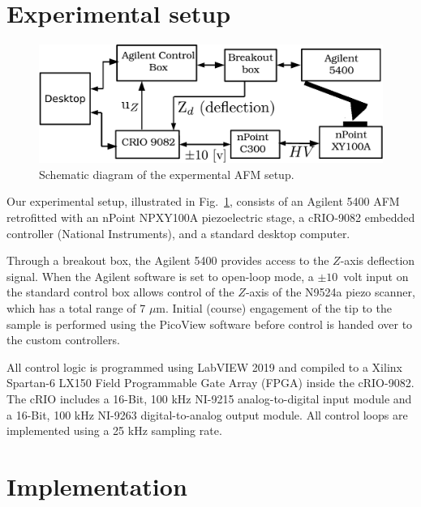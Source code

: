 \documentclass[twocolumn,oneside]{IEEEtran/IEEEtran}
\begin{document}
\section{Experimental setup} \label{sec:experimentalSetup}
\begin{figure}[ht!]
  \includegraphics[width=1\columnwidth]{figures/exp_setup.pdf}
  \caption{Schematic diagram of the expermental AFM setup.}
  \label{fig:exp_setup}
\end{figure}

Our experimental setup, illustrated in Fig.~\ref{fig:exp_setup},
consists of an Agilent 5400 AFM retrofitted with an nPoint NPXY100A
piezoelectric stage, a cRIO-9082 embedded controller (National
Instruments), and a standard desktop computer.

Through a breakout box, the Agilent 5400 provides access to the
$Z$-axis deflection signal. When the Agilent software is set to
open-loop mode, a $\pm10$~volt input on the standard control box
allows control of the $Z$-axis of the N9524a piezo scanner, which has
a total range of 7 $\mu$m. Initial (course) engagement of the tip to
the sample is performed using the PicoView software before control is
handed over to the custom controllers.
	
All control logic is programmed using LabVIEW 2019 and compiled to a
Xilinx Spartan-6 LX150 Field Programmable Gate Array (FPGA) inside the
cRIO-9082. The cRIO includes a 16-Bit, 100 kHz NI-9215
analog-to-digital input module and a 16-Bit, 100 kHz NI-9263
digital-to-analog output module. All control loops are implemented
using a 25 kHz sampling rate.


\section{Implementation}\label{sec:implementation}
\end{document}
